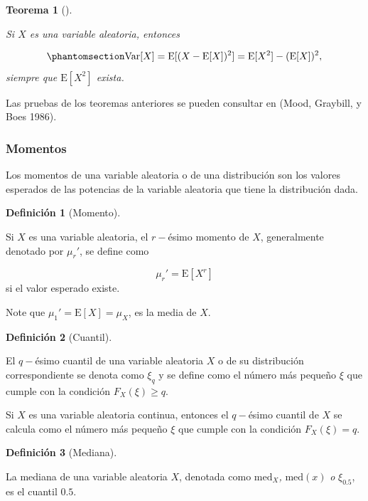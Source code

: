 \documentclass[
  us-letterpaper,
]{scrreprt}
\theoremstyle{plain}
\newtheorem{theorem}{Teorema}[chapter]
\theoremstyle{definition}
\newtheorem{definition}{Definición}[chapter]
\theoremstyle{definition}
\theoremstyle{plain}
\theoremstyle{remark}
\begin{document}
\begin{theorem}[]\protect\hypertarget{thm-var}{}\label{thm-var}

Si \(X\) es una variable aleatoria, entonces

\begin{equation}\phantomsection\label{eq-var}{\mathrm{Var}[X] = \mathrm E[(X-\mathrm E[X])^2] = \mathrm E[X^2] - (\mathrm E[X])^2,}\end{equation}
siempre que \(\mathrm E[X^2]\) exista.

\end{theorem}

Las pruebas de los teoremas anteriores se pueden consultar en (Mood,
Graybill, y Boes 1986).

\subsubsection{Momentos}\label{momentos}

Los momentos de una variable aleatoria o de una distribución son los
valores esperados de las potencias de la variable aleatoria que tiene la
distribución dada.

\begin{definition}[Momento]\protect\hypertarget{def-moment}{}\label{def-moment}

Si \(X\) es una variable aleatoria, el \(r-\)ésimo momento de \(X\),
generalmente denotado por \(\mu_r'\), se define como

\[ \mu_r'=\mathrm E[X^r] \] si el valor esperado existe.

\end{definition}

Note que \(\mu_1' = \mathrm E[X] = \mu_X\), es la media de \(X\).

\begin{definition}[Cuantil]\protect\hypertarget{def-quant}{}\label{def-quant}

El \(q-\)ésimo cuantil de una variable aleatoria \(X\) o de su
distribución correspondiente se denota como \(\xi_q\) y se define como
el número más pequeño \(\xi\) que cumple con la condición
\(F_X(\xi) \geq q\).

\end{definition}

Si \(X\) es una variable aleatoria continua, entonces el \(q-\)ésimo
cuantil de \(X\) se calcula como el número más pequeño \(\xi\) que
cumple con la condición \(F_X(\xi) = q\).

\begin{definition}[Mediana]\protect\hypertarget{def-median}{}\label{def-median}

La mediana de una variable aleatoria \(X\), denotada como
\(\mathrm{med}_X\)\emph{,} \(\mathrm{med}(x)\) \emph{o} \(\xi_{0.5}\),
es el cuantil \(0.5\).

\end{definition}
\end{document}
